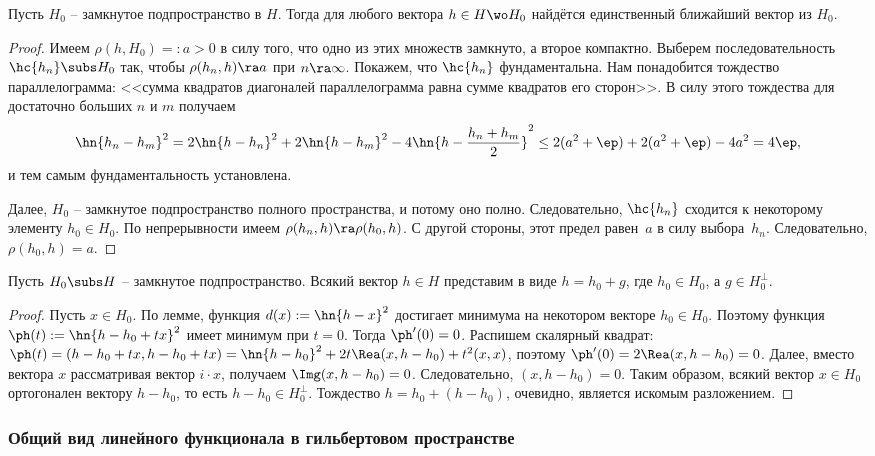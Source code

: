 \documentclass[a4paper]{article}
\begin{document}
\begin{lemma}
Пусть $H_0$ -- замкнутое подпространство в $H$. Тогда для любого вектора $h \in H \wo H_0$ найдётся единственный
ближайший вектор из $H_0$.
\end{lemma}
\begin{proof}
Имеем $\rho(h, H_0) =: a > 0$ в силу того, что одно из этих множеств замкнуто, а второе компактно.
Выберем последовательность $\hc{h_n} \subs H_0$ так, чтобы $\rho(h_n,h) \ra a$ при $n \ra \infty$.
Покажем, что $\hc{h_n}$ фундаментальна.
Нам понадобится тождество параллелограмма: <<сумма квадратов диагоналей параллелограмма равна
сумме квадратов его сторон>>. В силу этого тождества для достаточно больших $n$ и $m$ получаем
$$\hn{h_n - h_m}^2 = 2\hn{h-h_n}^2 + 2\hn{h-h_m}^2 - 4\hn{h - \frac{h_n+h_m}{2}}^2 \le
2(a^2 + \ep) + 2(a^2 + \ep) - 4a^2 = 4\ep,$$
и тем самым фундаментальность установлена.

Далее, $H_0$ -- замкнутое подпространство полного пространства, и потому оно полно.
Следовательно, $\hc{h_n}$ сходится к некоторому элементу $h_0 \in H_0$.
По непрерывности имеем $\rho(h_n,h) \ra \rho(h_0,h)$. С другой стороны, этот предел равен~$a$
в силу выбора~$h_n$. Следовательно, $\rho(h_0,h)=a$.
\end{proof}

\begin{imp}
Пусть $H_0 \subs H$ -- замкнутое подпространство.
Всякий вектор $h \in H$ представим в виде $h = h_0 + g$, где $h_0 \in H_0$, а $g \in H_0^\bot$.
\end{imp}
\begin{proof}
Пусть $x \in H_0$. По лемме, функция $d(x) := \hn{h - x}^2$ достигает минимума на
некотором векторе $h_0 \in H_0$. Поэтому функция $\ph(t) := \hn{h - h_0 + tx}^2$
имеет минимум при $t = 0$. Тогда $\ph'(0) = 0$. Распишем скалярный квадрат:
$\ph(t) = (h - h_0 +tx, h-h_0 +tx) = \hn{h-h_0}^2 + 2t\Rea(x,h-h_0) + t^2(x,x)$,
поэтому $\ph'(0) = 2\Rea(x,h -h_0) = 0$. Далее, вместо вектора $x$ рассматривая вектор $i\cdot x$,
получаем $\Img(x,h-h_0) = 0$. Следовательно, $(x,h-h_0) = 0$.
Таким образом, всякий вектор $x \in H_0$ ортогонален вектору $h - h_0$, то есть $h-h_0 \in H_0^\bot$.
Тождество $h = h_0 + (h-h_0)$, очевидно, является искомым разложением.
\end{proof}

\subsubsection{Общий вид линейного функционала в гильбертовом пространстве}
\end{document}
